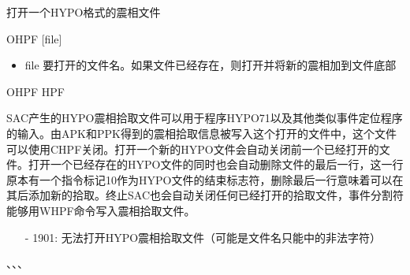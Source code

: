 \label{cmd:ohpf}

打开一个HYPO格式的震相文件

\begin{SACSTX}
OHPF [file]
\end{SACSTX}

\begin{itemize}
\item file  要打开的文件名。如果文件已经存在，则打开并将新的震相加到文件底部
\end{itemize}

\begin{SACDFT}
OHPF HPF
\end{SACDFT}

SAC产生的HYPO震相拾取文件可以用于程序HYPO71以及其他类似事件定位程序的输入。由APK和PPK得到的震相拾取信息被写入这个打开的文件中，这个文件可以使用CHPF关闭。打开一个新的HYPO文件会自动关闭前一个已经打开的文件。打开一个已经存在的HYPO文件的同时也会自动删除文件的最后一行，这一行原本有一个指令标记10作为HYPO文件的结束标志符，删除最后一行意味着可以在其后添加新的拾取。终止SAC也会自动关闭任何已经打开的拾取文件，事件分割符能够用WHPF命令写入震相拾取文件。

\begin{itemize}
\item[-]1901: 无法打开HYPO震相拾取文件（可能是文件名只能中的非法字符）
\end{itemize}

、、、
